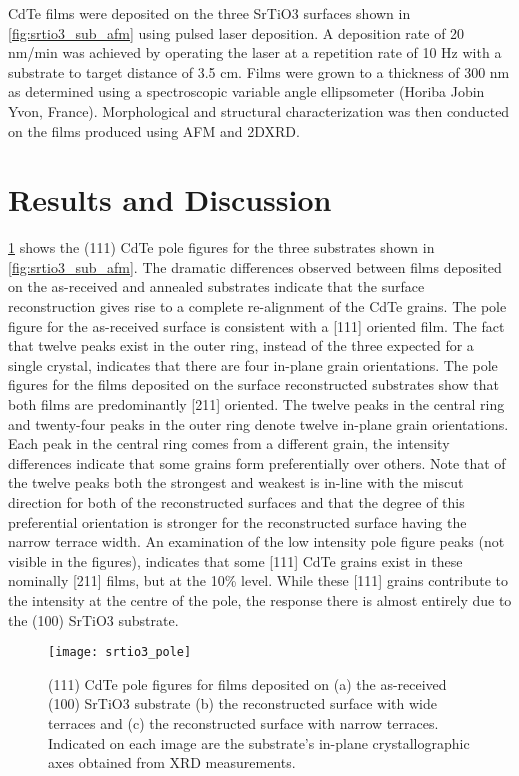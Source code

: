 CdTe films were deposited on the three SrTiO3 surfaces shown
in \cref{fig:srtio3_sub_afm} using pulsed laser deposition. A deposition rate of 20 nm/min was achieved by
operating the laser at a repetition rate of 10 Hz with a substrate to
target distance of 3.5 cm. Films were grown to
a thickness of 300 nm as determined using a spectroscopic variable
angle ellipsometer (Horiba Jobin Yvon, France). Morphological and
structural characterization was then conducted on the films
produced using AFM and 2DXRD.
\section{Results and Discussion}
\cref{fig:srtio3_pole} shows the (111) CdTe pole figures for the three substrates
shown in \cref{fig:srtio3_sub_afm}. The dramatic differences observed between films
deposited on the as-received and annealed substrates indicate that
the surface reconstruction gives rise to a complete re-alignment of
the CdTe grains. The pole figure for the as-received surface is
consistent with a [111] oriented film. The fact that twelve peaks
exist in the outer ring, instead of the three expected for a single
crystal, indicates that there are four in-plane grain orientations.
The pole figures for the films deposited on the surface reconstructed substrates show that both films are predominantly [211]
oriented. The twelve peaks in the central ring and twenty-four
peaks in the outer ring denote twelve in-plane grain orientations. Each peak in the central ring comes from a different grain, the intensity differences indicate that some grains form
preferentially over others. Note that of the twelve peaks both
the strongest and weakest is in-line with the miscut direction for
both of the reconstructed surfaces and that the degree of this
preferential orientation is stronger for the reconstructed surface
having the narrow terrace width. An examination of the low
intensity pole figure peaks (not visible in the figures), indicates that
some [111] CdTe grains exist in these nominally [211] films, but
at the 10\% level. While these [111] grains contribute to
the intensity at the centre of the pole, the response there is almost
entirely due to the (100) SrTiO3 substrate.
\begin{figure}
    \centering
    \texttt{[image: srtio3\_pole]}
    \caption{\label{fig:srtio3_pole}(111) CdTe pole figures for films deposited on (a) the as-received (100) SrTiO3 substrate (b) the reconstructed surface with wide terraces and (c) the reconstructed surface with narrow terraces. Indicated on each image are the substrate’s in-plane crystallographic axes obtained from XRD measurements.}
\end{figure}
